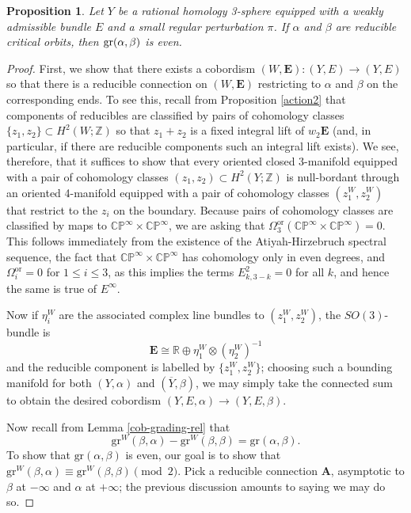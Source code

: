 \documentclass{memo-l}
\newtheorem{proposition}[theorem]{Proposition}
\theoremstyle{definition}
\theoremstyle{remark}
\numberwithin{section}{chapter}
\numberwithin{equation}{chapter}
\begin{document}
\begin{proposition}\label{gr-red}Let $Y$ be a rational homology 3-sphere equipped with a weakly admissible bundle $E$ and a small regular perturbation $\pi$. If $\alpha$ and $\beta$ are reducible critical orbits, then $\textup{gr}(\alpha, \beta)$ is even.
\end{proposition}
\begin{proof}First, we show that there exists a cobordism $(W,\mathbf{E}): (Y, E) \to (Y, E)$ so that there is a reducible connection on $(W,\mathbf{E})$ restricting to $\alpha$ and $\beta$ on the corresponding ends. To see this, recall from Proposition \ref{action2} that components of reducibles are classified by pairs of cohomology classes $\{z_1, z_2\} \subset H^2(W;\mathbb Z)$ so that $z_1 + z_2$ is a fixed integral lift of $w_2 \mathbf{E}$ (and, in particular, if there are reducible components such an integral lift exists). We see, therefore, that it suffices to show that every oriented closed $3$-manifold equipped with a pair of cohomology classes $(z_1, z_2) \subset H^2(Y;\mathbb Z)$ is null-bordant through an oriented 4-manifold equipped with a pair of cohomology classes $(z_1^W, z_2^W)$ that restrict to the $z_i$ on the boundary. Because pairs of cohomology classes are classified by maps to $\mathbb{CP}^\infty \times \mathbb{CP}^\infty$, we are asking that $\Omega_3^{\text{or}}(\mathbb{CP}^\infty \times \mathbb{CP}^\infty) = 0$. This follows immediately from the existence of the Atiyah-Hirzebruch spectral sequence, the fact that $\mathbb{CP}^\infty \times \mathbb{CP}^\infty$ has cohomology only in even degrees, and $\Omega_i^{\text{or}} = 0$ for $1 \leq i \leq 3$, as this implies the terms $E^2_{k, 3-k} = 0$ for all $k$, and hence the same is true of $E^\infty$.

Now if $\eta_i^W$ are the associated complex line bundles to $(z_1^W, z_2^W)$, the $SO(3)$-bundle is 
$$\mathbf{E} \cong \mathbb R \oplus \eta_1^W \otimes (\eta_2^W)^{-1}$$
and the reducible component is labelled by $\{z_1^W, z_2^W\}$; choosing such a bounding manifold for both $(Y,\alpha)$ and $(\overline Y, \beta)$, we may simply take the connected sum to obtain the desired cobordism $(Y,E,\alpha) \to (Y,E,\beta)$.

Now recall from Lemma \ref{cob-grading-rel} that $$\text{gr}^W(\beta, \alpha) - \text{gr}^W(\beta, \beta) =  \text{gr}(\alpha, \beta).$$
To show that $\text{gr}(\alpha, \beta)$ is even, our goal is to show that $\text{gr}^W(\beta, \alpha) \equiv \text{gr}^W(\beta, \beta) \pmod 2.$ Pick a reducible connection $\mathbf{A}$, asymptotic to $\beta$ at $-\infty$ and $\alpha$ at $+\infty$; the previous discussion amounts to saying we may do so.


\end{proof}
\end{document}

